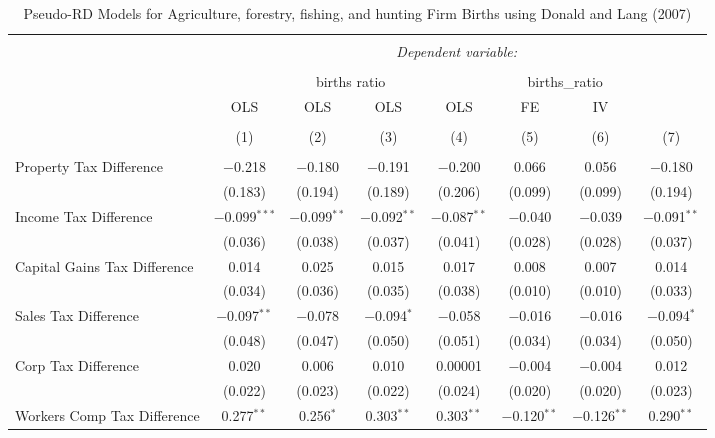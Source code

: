 
\begin{table}[!htbp] \centering 
  \caption{Pseudo-RD Models for  Agriculture, forestry, fishing, and hunting Firm Births using Donald and Lang (2007)} 
  \label{} 
\begin{tabular}{@{\extracolsep{5pt}}lccccccc} 
\\[-1.8ex]\hline 
\hline \\[-1.8ex] 
 & \multicolumn{7}{c}{\textit{Dependent variable:}} \\ 
\cline{2-8} 
\\[-1.8ex] & \multicolumn{4}{c}{births ratio} & \multicolumn{2}{c}{births\_ratio} &   \\ 
 & OLS & OLS & OLS & OLS & FE & IV &  \\ 
\\[-1.8ex] & (1) & (2) & (3) & (4) & (5) & (6) & (7)\\ 
\hline \\[-1.8ex] 
 Property Tax Difference & $-$0.218 & $-$0.180 & $-$0.191 & $-$0.200 & 0.066 & 0.056 & $-$0.180 \\ 
  & (0.183) & (0.194) & (0.189) & (0.206) & (0.099) & (0.099) & (0.194) \\ 
  Income Tax Difference & $-$0.099$^{***}$ & $-$0.099$^{**}$ & $-$0.092$^{**}$ & $-$0.087$^{**}$ & $-$0.040 & $-$0.039 & $-$0.091$^{**}$ \\ 
  & (0.036) & (0.038) & (0.037) & (0.041) & (0.028) & (0.028) & (0.037) \\ 
  Capital Gains Tax Difference & 0.014 & 0.025 & 0.015 & 0.017 & 0.008 & 0.007 & 0.014 \\ 
  & (0.034) & (0.036) & (0.035) & (0.038) & (0.010) & (0.010) & (0.033) \\ 
  Sales Tax Difference & $-$0.097$^{**}$ & $-$0.078 & $-$0.094$^{*}$ & $-$0.058 & $-$0.016 & $-$0.016 & $-$0.094$^{*}$ \\ 
  & (0.048) & (0.047) & (0.050) & (0.051) & (0.034) & (0.034) & (0.050) \\ 
  Corp Tax Difference & 0.020 & 0.006 & 0.010 & 0.00001 & $-$0.004 & $-$0.004 & 0.012 \\ 
  & (0.022) & (0.023) & (0.022) & (0.024) & (0.020) & (0.020) & (0.023) \\ 
  Workers Comp Tax Difference & 0.277$^{**}$ & 0.256$^{*}$ & 0.303$^{**}$ & 0.303$^{**}$ & $-$0.120$^{**}$ & $-$0.126$^{**}$ & 0.290$^{**}$ \\ 

\end{tabular}
\end{table}
